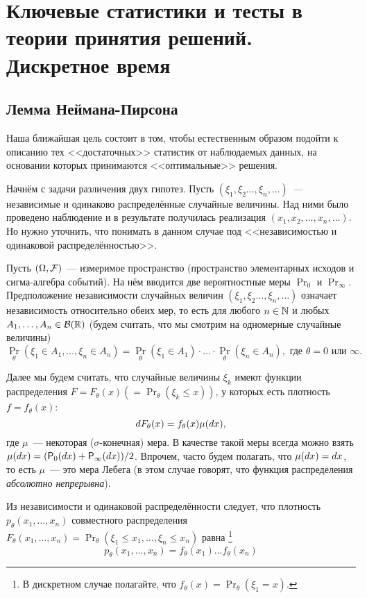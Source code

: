 \section{Ключевые статистики и тесты в теории принятия решений. Дискретное 
время}
\subsection{Лемма Неймана-Пирсона}
Наша ближайшая цель состоит в том, чтобы естественным образом подойти к 
описанию тех <<достаточных>> статистик от наблюдаемых данных, на основании 
которых принимаются <<оптимальные>> решения.

Начнём с задачи различения двух гипотез. Пусть \((\xi_{1}, \xi_{2} \ldots, 
\xi_{n}, \ldots)\)~--- независимые и одинаково распределённые случайные 
величины. Над ними было проведено наблюдение и в результате получилась 
реализация \((x_{1}, x_{2}, \ldots, x_{n}, \ldots)\). Но нужно уточнить, что 
понимать в данном случае под <<независимостью и одинаковой распределённостью>>.

Пусть \((\Omega, \mathcal{F})\)~--- измеримое пространство (пространство элементарных 
исходов и сигма-алгебра событий). На нём вводится две вероятностные меры 
\(\Pr_{0}\) и \(\Pr_{\infty}\). Предположение независимости случайных величин 
\((\xi_{1}, \xi_{2} \ldots, \xi_{n}, \ldots)\) означает независимость 
относительно обеих мер, то есть для любого \(n \in \mathbb{N}\) и любых \(A_{1}, 
\ldots, A_{n} \in \mathcal{B}(\mathbb{R})\) (будем считать, что мы смотрим на одномерные 
случайные величины)
\[
	\Pr_{\theta}(\xi_{1} \in A_{1}, \ldots, \xi_{n} \in A_{n}) = 
	\Pr_{\theta}(\xi_{1} \in A_{1}) \cdot \ldots \cdot \Pr_{\theta}(\xi_{n} \in 
	A_{n}), \text{ где } \theta = 0 \text{ или } \infty.
\]

Далее мы будем считать, что случайные величины \(\xi_{k}\) имеют функции 
распределения \(F = F_{\theta}(x) (= \Pr_{\theta}(\xi_{k} \leq x))\), у которых 
есть плотность \(f = f_{\theta}(x)\):
\[
	\mathop{}\!d F_{\theta}(x) = f_{\theta}(x)\mu(\mathop{}\!d x),
\]
где \(\mu\)~--- некоторая (\(\sigma\)-конечная) мера. В качестве такой меры 
всегда можно взять \(\mu(\diff x) = (\Pr_{0}(\diff x) + \Pr_{\infty}(\diff 
x))/2\). Впрочем, часто будем полагать, что \(\mu(\mathop{}\!d x) = \mathop{}\!d x\), то есть 
\(\mu\)~--- это мера Лебега (в этом случае говорят, что функция распределения 
\emph{абсолютно непрерывна}).

Из независимости и одинаковой распределённости следует, что плотность 
\(p_{\theta}(x_{1}, \ldots, x_{n})\) совместного распределения \(F_{\theta} 
(x_{1}, \ldots, x_{n}) = \Pr_{\theta}(\xi_{1} \leq x_{1}, \ldots, \xi_{n} \leq 
x_{n})\) равна%
\footnote{В дискретном случае полагайте, что \(f_{\theta}(x) = 
\Pr_{\theta}(\xi_{1} = x)\).}
\begin{equation}\label{eq:density-independent}
	p_{\theta}(x_{1}, \ldots, x_{n}) = f_{\theta}(x_{1}) \ldots 
	f_{\theta}(x_{n})
\end{equation} 

